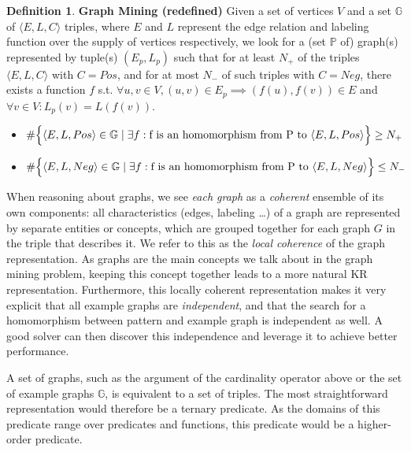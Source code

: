 \documentclass{article}
\theoremstyle{definition}
\newtheorem{definition}{Definition}[section]
\newcommand{\triple}[1]{\ensuremath{\langle #1 \rangle}}
\newcommand{\pair}[1]{\ensuremath{\left(#1\right)}}
\newcommand{\graphset}[1]{\ensuremath{\mathbb{#1}}}
\begin{document}
\begin{definition} \textbf{Graph Mining (redefined)}
\label{def:gm2}
Given a set of vertices $V$ and a set $\graphset{G}$ of $\triple{E, L, C}$ triples,
where $E$ and $L$ represent the edge relation and labeling function over the supply of vertices respectively,
we look for a (set $\graphset{P}$ of)  graph(s) represented by tuple(s) $\pair{E_{p}, L_{p}}$ such that
for at least $N_{+}$ of the triples $\triple{ E, L, C}$ with $C=Pos$, and for at most $N_{-}$ of such triples with $C=Neg$, there exists a function $f$ s.t. $\forall u,v \in V, \pair{u,v} \in E_{p} \implies \pair{f(u),f(v)} \in E$ and $\forall v \in V : L_{p}(v) = L(f(v))$.

\begin{itemize}
\item $\#\Big\lbrace \triple{E,L,Pos} \in \graphset{G} \; | \; \exists f : \text{f is an homomorphism from P to \triple{E,L,Pos}} \Big\rbrace \geq N_{+}$

\item $\#\Big\lbrace \triple{E,L,Neg} \in \graphset{G} \; | \; \exists f : \text{f is an homomorphism from P to \triple{E,L,Neg}} \Big\rbrace \leq N_{-}$
\end{itemize}
\end{definition}

When reasoning about graphs, we see \emph{each graph} as a \emph{coherent} ensemble of its own components: 
all characteristics (edges, labeling \ldots) of a graph are represented by separate entities or concepts, which are grouped together for each graph $G$ in the triple that describes it.
We refer to this as the \emph{local coherence} of the graph representation.
As graphs are the main concepts we talk about in the graph mining problem, keeping this concept together leads to a more natural KR representation.
Furthermore, this locally coherent representation makes it very explicit that all example graphs are \emph{independent}, and that the search for a homomorphism between pattern and example graph is independent as well.
A good solver can then discover this independence and leverage it to achieve better performance.

A set of graphs, such as the argument of the cardinality operator above or the set of example graphs $\graphset{G}$, is equivalent to a set of triples.
The most straightforward representation would therefore be a ternary predicate.
As the domains of this predicate range over predicates and functions, this predicate would be a higher-order predicate.
\end{document}
